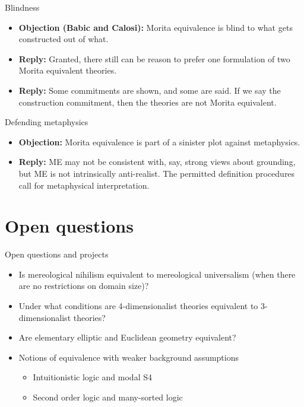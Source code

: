 \documentclass[fleqn]{beamer}
\begin{document}

\begin{frame}{Blindness}

  \begin{itemize}
  \item \textbf{Objection (Babic and Calosi):} Morita equivalence is
    blind to what gets constructed out of what.
  \item \textbf{Reply:} Granted, there still can be reason to prefer
    one formulation of two Morita equivalent theories.
  \item \textbf{Reply:} Some commitments are shown, and some are
    said. If we say the construction commitment, then the theories are
    not Morita equivalent.
  \end{itemize}


\end{frame}

\begin{frame}{Defending metaphysics}

  \begin{itemize}
  \item \textbf{Objection:} Morita equivalence is part of a sinister
    plot against metaphysics.
  \item \textbf{Reply:} ME may not be consistent with, say, strong
    views about grounding, but ME is not intrinsically
    anti-realist. The permitted definition procedures call for
    metaphysical interpretation.
  \end{itemize}
  
\end{frame}



\section{Open questions}

\begin{frame}{Open questions and projects}

  \begin{itemize}
  \item Is mereological nihilism equivalent to mereological
    universalism (when there are no restrictions on domain size)?
  \item Under what conditions are 4-dimensionalist theories equivalent
    to 3-dimensionalist theories?
  \item Are elementary elliptic and Euclidean geometry equivalent?
    \citep[see][]{glymour}
  \item Notions of equivalence with weaker background assumptions
    \begin{itemize}
    \item Intuitionistic logic and modal S4
    \item Second order logic and many-sorted logic
      \citep[see][]{manzano}
    \end{itemize}
  \end{itemize}


\end{frame}
\end{document}
